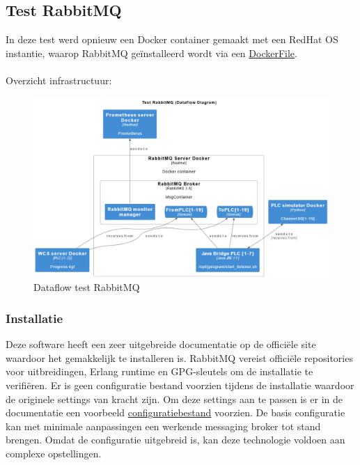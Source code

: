 \subsection{Test RabbitMQ}
In deze test werd opnieuw een Docker container gemaakt met een RedHat OS instantie, waarop RabbitMQ 
geïnstalleerd wordt via een \hyperref[listing:docker_rabbitmq]{DockerFile}.
\\\\
Overzicht infrastructuur:
\begin{figure}[h!]
  \centering
  \includegraphics[width=.95\textwidth]{img/test-rabbitmq-dataflow.png}
  \caption{\label{fig:test_rabbitmq_dataflow}Dataflow test RabbitMQ}
\end{figure}

\subsubsection{Installatie}
Deze software heeft een zeer uitgebreide documentatie op de officiële site waardoor het gemakkelijk te installeren is.
RabbitMQ vereist officiële repositories voor uitbreidingen, Erlang runtime en GPG-sleutels om de installatie te verifiëren.
Er is geen configuratie bestand voorzien tijdens de installatie waardoor de originele settings van kracht zijn.
Om deze settings aan te passen is er in de documentatie een voorbeeld \hyperref[sec:config_rabbitmq]{configuratiebestand} voorzien.
De basis configuratie kan met minimale aanpassingen een werkende messaging broker tot stand brengen.
Omdat de configuratie uitgebreid is, kan deze technologie voldoen aan complexe opstellingen.

